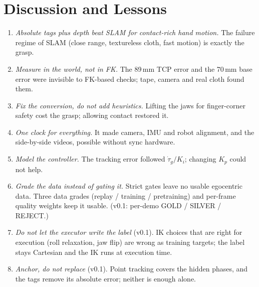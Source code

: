 \documentclass[conference,10pt]{IEEEtran}
\newcommand{\mm}{\,mm\xspace}
\begin{document}
\section{Discussion and Lessons}\label{sec:lessons}
\begin{enumerate}
\item \emph{Absolute tags plus depth beat SLAM for contact-rich hand motion.} The failure regime of SLAM (close range,
  textureless cloth, fast motion) is exactly the grasp.
\item \emph{Measure in the world, not in FK.} The 89\mm TCP error and the 70\mm base error were invisible to FK-based
  checks; tape, camera and real cloth found them.
\item \emph{Fix the conversion, do not add heuristics.} Lifting the jaws for finger-corner safety cost the grasp; allowing
  contact restored it.
\item \emph{One clock for everything.} It made camera, IMU and robot alignment, and the side-by-side videos, possible
  without sync hardware.
\item \emph{Model the controller.} The tracking error followed $\dot\tau_g/K_i$; changing $K_p$ could not help.
\item \emph{Grade the data instead of gating it.} Strict gates leave no usable egocentric data. Three data grades (replay /
  training / pretraining) and per-frame quality weights keep it usable. (v0.1: per-demo GOLD / SILVER / REJECT.)
\item \emph{Do not let the executor write the label} (v0.1). IK choices that are right for execution (roll relaxation,
  jaw flip) are wrong as training targets; the label stays Cartesian and the IK runs at execution time.
\item \emph{Anchor, do not replace} (v0.1). Point tracking covers the hidden phases, and the tags remove its absolute
  error; neither is enough alone.
\end{enumerate}

\end{document}
